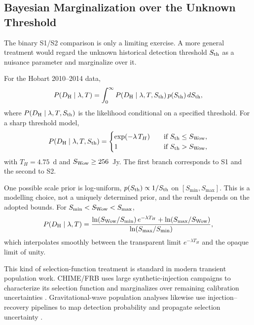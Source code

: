 \documentclass[crop]{CSL}
\begin{document}

\subsection{Bayesian Marginalization over the Unknown Threshold}
\label{sec:h5_bayes_marg}

The binary S1/S2 comparison is only a limiting exercise. A more general treatment would regard the unknown historical detection threshold $S_{\rm th}$ as a nuisance parameter and marginalize over it.

For the Hobart 2010--2014 data,
\begin{equation}
P(D_{\rm H}\mid\lambda,T)
=
\int_0^\infty
P(D_{\rm H}\mid\lambda,T,S_{\rm th})\,
p(S_{\rm th})\,
dS_{\rm th},
\label{eq:marg_sth}
\end{equation}
where $P(D_{\rm H}\mid\lambda,T,S_{\rm th})$ is the likelihood conditional on a specified threshold. For a sharp threshold model,
\begin{equation}
P(D_{\rm H}\mid\lambda,T,S_{\rm th})
=
\begin{cases}
\exp(-\lambda\,T_H) \quad & \text{if } S_{\rm th}\leq S_{\rm Wow},\\
1 \quad & \text{if } S_{\rm th}>S_{\rm Wow},
\end{cases}
\label{eq:cond_sth}
\end{equation}
with $T_H=4.75$~d and $S_{\rm Wow}\geq256$~Jy. The first branch corresponds to S1 and the second to S2.

One possible scale prior is log-uniform, $p(S_{\rm th})\propto1/S_{\rm th}$ on $[S_{\min},S_{\max}]$. This is a modelling choice, not a uniquely determined prior, and the result depends on the adopted bounds. For $S_{\min}<S_{\rm Wow}<S_{\max}$,
\begin{equation}
P(D_{\rm H}\mid\lambda,T)
=
\frac{
\ln(S_{\rm Wow}/S_{\min})\,e^{-\lambda T_H}
+\ln(S_{\max}/S_{\rm Wow})
}
{\ln(S_{\max}/S_{\min})},
\label{eq:marg_result}
\end{equation}
which interpolates smoothly between the transparent limit $e^{-\lambda T_H}$ and the opaque limit of unity.

This kind of selection-function treatment is standard in modern transient population work. CHIME/FRB uses large synthetic-injection campaigns to characterize its selection function and marginalizes over remaining calibration uncertainties \citep{amiri2021}. Gravitational-wave population analyses likewise use injection--recovery pipelines to map detection probability and propagate selection uncertainty \citep{mandel2019,abbott2023_pop}.
\end{document}

